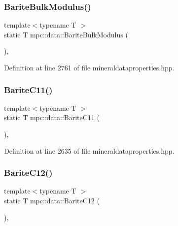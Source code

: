 \subsubsection{\texorpdfstring{Barite\+Bulk\+Modulus()}{BariteBulkModulus()}}
{\footnotesize\ttfamily template$<$typename T $>$ \\
static T mpc\+::data\+::\+Barite\+Bulk\+Modulus (\begin{DoxyParamCaption}{ }\end{DoxyParamCaption})\hspace{0.3cm}{\ttfamily [inline]}, {\ttfamily [static]}}



Definition at line 2761 of file mineraldataproperties.\+hpp.

\mbox{\label{namespacempc_1_1data_aa2986523c8f0c5725449479052670e04}} 
\subsubsection{\texorpdfstring{Barite\+C11()}{BariteC11()}}
{\footnotesize\ttfamily template$<$typename T $>$ \\
static T mpc\+::data\+::\+Barite\+C11 (\begin{DoxyParamCaption}{ }\end{DoxyParamCaption})\hspace{0.3cm}{\ttfamily [inline]}, {\ttfamily [static]}}



Definition at line 2635 of file mineraldataproperties.\+hpp.

\mbox{\label{namespacempc_1_1data_a8f1a01d1c3396daa81a125bcfb8bae66}} 
\subsubsection{\texorpdfstring{Barite\+C12()}{BariteC12()}}
{\footnotesize\ttfamily template$<$typename T $>$ \\
static T mpc\+::data\+::\+Barite\+C12 (\begin{DoxyParamCaption}{ }\end{DoxyParamCaption})\hspace{0.3cm}{\ttfamily [inline]}, {\ttfamily [static]}}



